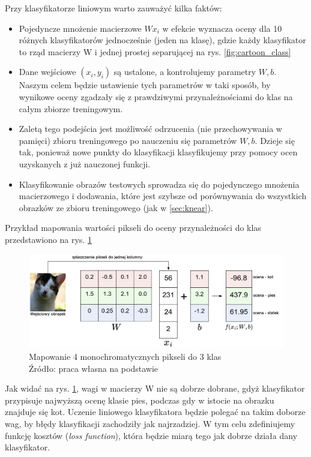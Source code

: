 Przy klasyfikatorze liniowym warto zauważyć kilka faktów:
\begin{itemize}
	\item Pojedyncze mnożenie macierzowe $Wx_i$ w efekcie wyznacza oceny dla 10 różnych klasyfikatorów jednocześnie (jeden na klasę), gdzie każdy klasyfikator to rząd macierzy W i jednej prostej separującej na rys. \ref{fig:cartoon_class}
	\item Dane wejściowe $(x_i,y_i)$ są ustalone, a kontrolujemy parametry $W,b$. Naszym celem będzie ustawienie tych parametrów w taki sposób, by wynikowe oceny zgadzały się z prawdziwymi przynależnościami do klas na całym zbiorze treningowym.
	\item Zaletą tego podejścia jest możliwość odrzucenia (nie przechowywania w pamięci) zbioru treningowego po nauczeniu się parametrów $W,b$. Dzieje się tak, ponieważ nowe punkty do klasyfikacji klasyfikujemy przy pomocy ocen uzyskanych z już nauczonej funkcji.
	\item Klasyfikowanie obrazów testowych sprowadza się do pojedynczego mnożenia macierzowego i dodawania, które jest szybsze od porównywania do wszystkich obrazków ze zbioru treningowego (jak w \ref{sec:knear}).
\end{itemize}

Przykład mapowania wartości pikseli do oceny przynależności do klas przedstawiono na rys. \ref{fig:lin_class}
\begin{figure}[h!tb]
	 \centering
	 \includegraphics[width = 1.0\linewidth]{img/lin_klas}
	 \caption{Mapowanie 4 monochromatycznych pikseli do 3 klas \\
              Źródło: praca własna na podstawie \cite{cs231n}}
	 \label{fig:lin_class}
\end{figure}

Jak widać na rys. \ref{fig:lin_class}, wagi w macierzy W nie są dobrze dobrane, gdyż klasyfikator przypisuje najwyższą ocenę klasie pies, podczas gdy w istocie na obrazku znajduje się kot.
Uczenie liniowego klasyfikatora będzie polegać na takim doborze wag, by błędy klasyfikacji zachodziły jak najrzadziej.
W tym celu zdefiniujemy funkcję kosztów (\textit{loss function}), która będzie miarą tego jak dobrze działa dany klasyfikator.\cite{cs231n}

